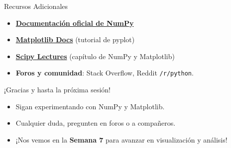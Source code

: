 \documentclass[10pt]{beamer}
\begin{document}
\begin{frame}{Recursos Adicionales}
  \begin{itemize}
    \item \href{https://numpy.org/doc/}{\textbf{Documentación oficial de NumPy}}
    \item \href{https://matplotlib.org/stable/}{\textbf{Matplotlib Docs}} (tutorial de pyplot)
    \item \href{https://scipy-lectures.org/}{\textbf{Scipy Lectures}} (capítulo de NumPy y Matplotlib)
    \item \textbf{Foros y comunidad}: Stack Overflow, Reddit \texttt{/r/python}.
  \end{itemize}
\end{frame}

\begin{frame}
  \Huge{\centerline{¡Gracias y hasta la próxima sesión!}}
  \vspace{0.4cm}
  \normalsize
  \begin{itemize}
    \item Sigan experimentando con NumPy y Matplotlib.
    \item Cualquier duda, pregunten en foros o a compañeros.
    \item ¡Nos vemos en la \textbf{Semana 7} para avanzar en visualización y análisis!
  \end{itemize}
\end{frame}
\end{document}
